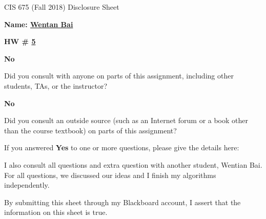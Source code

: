 \documentclass[12pt]{article}
\newcommand*\circled[1]{\tikz[baseline=(char.base)]{
            \node[shape=circle,draw,inner sep=2pt] (char) {#1};}}
\begin{document}
\begin{center}
  \Large
  CIS 675 (Fall 2018) Disclosure Sheet 
\end{center} 
\vspace*{2em}

\noindent
\textbf{\Large Name: \underline{ Wentan Bai }} 


\noindent 
\begin{minipage}[t]{1.0\linewidth}

\begin{minipage}[t]{0.25\linewidth}
\textbf{\Large
  HW \# \underline{ 5 }
} 

\end{minipage} \vspace*{3ex}




\begin{minipage}[t]{.8in}
  \textbf{\circled{Yes} \quad No}
\end{minipage}
\qquad 
\begin{minipage}[t]{5.5in}
  Did you consult with anyone on parts of this assignment, including other students, TAs, or the instructor? 
\end{minipage}
\vspace*{1ex}

\begin{minipage}[t]{.8in}
  \textbf{\circled{Yes} \quad No}
\end{minipage}
\qquad 
\begin{minipage}[t]{5.5in}
  Did you consult an outside source (such as an Internet forum or a
  book other than the course textbook) on parts of this assignment? 
\end{minipage}
\vspace*{1ex}

\noindent
  If you answered \textbf{Yes} to one or more questions, please give the details here: \vspace*{5ex} \par
  I also consult all questions and extra question with another student, Wentian Bai. For all questions, we discussed our ideas and I finish my algorithms independently. 


\vfill
\end{minipage}



\vspace*{40ex}

By submitting this sheet through my Blackboard account, I assert that the information on this sheet is true.
\end{document}
